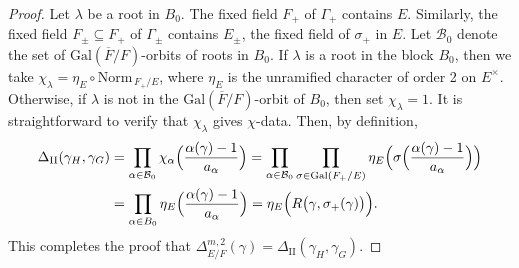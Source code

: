 \documentclass{amsart}
\begin{document}
\begin{proof}
Let $\lambda$ be a root in $B_0$.  The fixed field $F_+$ of $\Gamma_+$
contains $E$.  Similarly, the fixed field $F_\pm\subseteq F_+$
of $\Gamma_\pm$ contains $E_\pm$, the fixed field of $\sigma_+$ in 
$E$.  Let ${\mathcal B}_0$ denote the set of $\text{Gal}(\overline F/F)$-orbits
of roots in $B_0$. If $\lambda$ is a root in the block $B_0$, then we take
%
  $ \chi_{\lambda}  = \eta_E \circ \text{Norm}_{\, F_+/E} $, where
  $ \eta_E $ is
the unramified character of order 2 on $E^\times$. Otherwise, if
$\lambda$ is not in the $\text{Gal}(\overline F/F)$-orbit of $B_0$, then
set $\chi_\lambda=1$.
It is straightforward to verify that
  $ \chi_{\lambda} $
gives
  $ \chi $-data.
Then, by definition,
%
\begin{align*}
  \Delta_{\text{II}} (\gamma_H, \gamma_G)
  &=
  \prod_{\alpha\in{\mathcal B}_0}
  \chi_{\alpha}
  \Bigl(
    \frac
      { \alpha (\gamma)-1 }
      { a_{\alpha} }
  \Bigr)
=
  \prod_{\alpha\in{\mathcal B}_0}
  \prod_{\sigma \in \text{Gal}(F_+/E)}
  \eta_E
  \Bigl(
    \sigma
    \Bigl(
      \frac
        { \alpha (\gamma)-1 }
        { a_{\alpha} }
    \Bigr)
  \Bigr) 
\\
\vspace{10pt}
&=
  \prod_{\alpha\in B_0}
  \eta_E
  \Bigl(
    \frac
      { \alpha (\gamma)-1 }
      { a_{\alpha} }
  \Bigr) =
  \eta_E
  \Bigl(
    R \bigl( \gamma, \sigma_+ (\gamma) \bigr)
  \Bigr).
\end{align*}
%
This completes the proof that
  $ \Delta_{E/F}^{m,2} (\gamma) =
    \Delta_{\text{II}}
    (\gamma_H, \gamma_G) $.


\end{proof}
\end{document}
